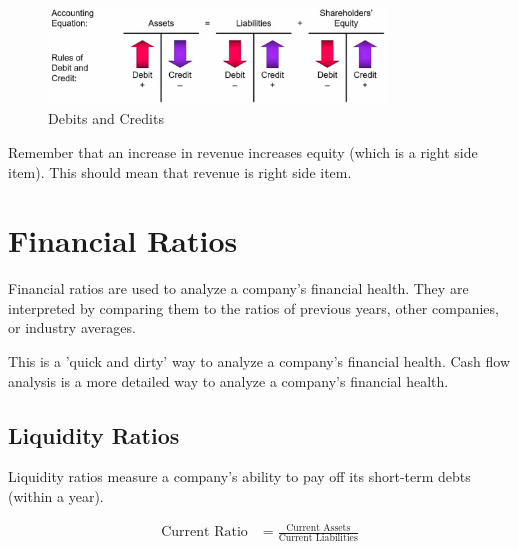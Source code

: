 \begin{figure}[H]
    \centering
    \includegraphics[width=0.8\textwidth]{LECTURE_8/credits-and-debits.png}
    \caption{Debits and Credits}

\end{figure}


\begin{remark}
    Remember that an increase in revenue increases equity (which is a right side item). This should mean that revenue is right side item.\\
\end{remark}

\section{Financial Ratios}

\begin{definition}
    Financial ratios are used to analyze a company's financial health. They are interpreted by comparing them to the ratios of previous years, other companies, or industry averages.
\end{definition}

\begin{remark}
    This is a 'quick and dirty' way to analyze a company's financial health. Cash flow analysis is a more detailed way to analyze a company's financial health.
\end{remark}

\subsection{Liquidity Ratios}

\begin{definition}
    Liquidity ratios measure a company's ability to pay off its short-term debts (within a year).
\end{definition}

\begin{theorem}
    \begin{align}
        \text{Current Ratio} & = \frac{\text{Current Assets}}{\text{Current Liabilities}}
    \end{align}
\end{theorem}

